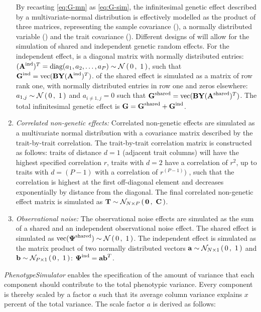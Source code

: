 \begin{enumerate}
By recasting \cref{eq:G-mn} as \cref{eq:G-sim}, the infinitesimal genetic effect  described by a multivariate-normal distribution is effectively modelled as the product of three matrices, representing the sample covariance (), a normally distributed variable () and the trait covariance (). Different designs of  will allow for the simulation of shared and independent genetic random effects. For the independent effect,  is a diagonal matrix with normally distributed entries: \((\boldsymbol{\mathbf{A}}^\text{ind})^T = \text{diag}(a_1, a_2,  \dotsc , a_P) \sim \mathcal{N}\left(\,{0}\,,~{1}\,\right)\), such that \(\boldsymbol{\mathbf{G}}^\text{ind} =  \text{vec}(\boldsymbol{\mathbf{BY}}(\boldsymbol{\mathbf{A}}^\text{ind})^T) \).  of the shared effect is simulated as a matrix of row rank one, with normally distributed entries in row one and zeros elsewhere: \(a_{1,j} \sim \mathcal{N}\left(\,{0}\,,~{1}\,\right)\) and \(a_{i \neq 1,j} = 0\) such that \(\boldsymbol{\mathbf{G}}^\text{shared} =  \text{vec}(\boldsymbol{\mathbf{BY}}(\boldsymbol{\mathbf{A}}^\text{shared})^T) \). The total infinitesimal genetic effect  is \(\boldsymbol{\mathbf{G}} = \boldsymbol{\mathbf{G}}^\text{shared} + \boldsymbol{\mathbf{G}}^\text{ind}\). 
%
\item \textit{Correlated non-genetic effects:}  Correlated non-genetic effects are simulated as a multivariate normal distribution with a covariance matrix described by the trait-by-trait correlation. The trait-by-trait correlation matrix  is constructed as follows: traits of distance \(d=1\) (adjacent trait columns) will have the highest specified correlation \(r\), traits with \(d=2\) have a correlation of \(r^2\), up to traits with \(d=(P - 1)\) with a correlation of \(r^{(P - 1)})\) , such that the correlation is highest at the first off-diagonal element and decreases exponentially by distance from the diagonal. The final correlated non-genetic effect matrix is simulated as \(\boldsymbol{\mathbf{T}} \sim \mathcal{N}_{N\times P}\left(\, {\boldsymbol{\mathbf{0}}} \,,~{\boldsymbol{\mathbf{C}}} \,\right)\).
%
\item \textit{Observational noise:} The observational noise effects \tmat{\Psi} are simulated as the sum of a shared and an independent observational noise effect. The shared effect  is simulated as \(\text{vec}(\boldsymbol{\mathbf{\Psi}}^\text{shared}) \sim \mathcal{N}\left(\,{0}\,,~{1}\,\right)\). The independent  effect  is simulated as the matrix product of two normally distributed vectors \(\boldsymbol{\mathbf{a}} \sim \mathcal{N}_{N\times 1}\left(\, {0} \,,~{1} \,\right)\) and \(\boldsymbol{\mathbf{b}} \sim \mathcal{N}_{P\times 1}\left(\, {0} \,,~{1} \,\right)\): \(\boldsymbol{\mathbf{\Psi}}^\text{ind} = \boldsymbol{\mathbf{ab}}^T\).
\end{enumerate}
%
\textit{PhenotypeSimulator} enables the specification of the amount of variance that each component should contribute to the total phenotypic variance. Every component is thereby scaled by a factor \(a\) such that its average column variance explains \(x\) percent of the total variance. The scale factor \(a\) is derived as follows: 
